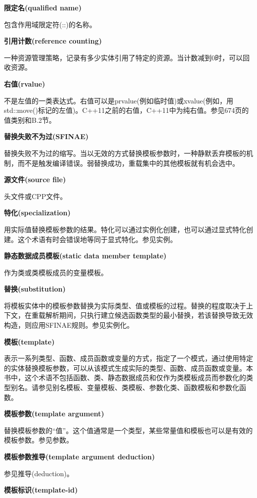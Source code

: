 \noindent
\textbf{限定名(qualified name)}

包含作用域限定符(::)的名称。

\noindent
\textbf{引用计数(reference counting)}

一种资源管理策略，记录有多少实体引用了特定的资源。当计数减到0时，可以回收资源。

\noindent
\textbf{右值(rvalue)}

不是左值的一类表达式。右值可以是prvalue(例如临时值)或xvalue(例如，用std::move()标记的左值)。C++11之前的右值，C++11中为纯右值。参见674页的值类别和B.2节。

\noindent
\textbf{替换失败不为过(SFINAE)}

替换失败不为过的缩写。当以无效的方式替换模板参数时，一种静默丢弃模板的机制，而不是触发编译错误。弱替换成功，重载集中的其他模板就有机会选中。

\noindent
\textbf{源文件(source file)}

头文件或CPP文件。

\noindent
\textbf{特化(specialization)}

用实际值替换模板参数的结果。特化可以通过实例化创建，也可以通过显式特化创建。这个术语有时会错误地等同于显式特化。参见实例。

\noindent
\textbf{静态数据成员模板(static data member template)}

作为类或类模板成员的变量模板。

\noindent
\textbf{替换(substitution)}

将模板实体中的模板参数替换为实际类型、值或模板的过程。替换的程度取决于上下文，在重载解析期间，只执行建立候选函数类型的最小替换，若该替换导致无效构造，则应用SFINAE规则。参见实例化。

\noindent
\textbf{模板(template)}

表示一系列类型、函数、成员函数或变量的方式，指定了一个模式，通过使用特定的实体替换模板参数，可以从该模式生成实际的类型、函数、成员函数或变量。本书中，这个术语不包括函数、类、静态数据成员和仅作为类模板成员而参数化的类型别名。请参见别名模板、变量模板、类模板、参数化类、函数模板和参数化函数。

\noindent
\textbf{模板参数(template argument)}

替换模板参数的“值”。这个值通常是一个类型，某些常量值和模板也可以是有效的模板参数。参见参数。

\noindent
\textbf{模板参数推导(template argument deduction)}

参见推导(deduction)。

\noindent
\textbf{模板标识(template-id)}


